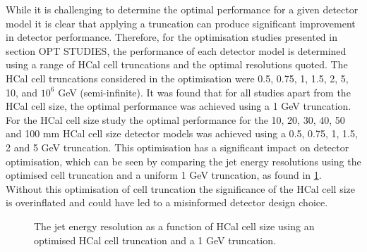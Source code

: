 While it is challenging to determine the optimal performance for a given detector model it is clear that applying a truncation can produce significant improvement in detector performance.  Therefore, for the optimisation studies presented in section OPT STUDIES, the performance of each detector model is determined using a range of HCal cell truncations and the optimal resolutions quoted.  The HCal cell truncations considered in the optimisation were 0.5, 0.75, 1, 1.5, 2, 5, 10, and $10^{6}$ GeV (semi-infinite).  It was found that for all studies apart from the HCal cell size, the optimal performance was achieved using a 1 GeV truncation.  For the HCal cell size study the optimal performance for the 10, 20, 30, 40, 50 and 100 mm HCal cell size detector models was achieved using a 0.5, 0.75, 1, 1.5, 2 and 5 GeV truncation.  This optimisation has a significant impact on detector optimisation, which can be seen by comparing the jet energy resolutions using the optimised cell truncation and a uniform 1 GeV truncation, as found in \ref{fig:jerhcalcellopt}.  Without this optimisation of cell truncation the significance of the HCal cell size is overinflated and could have led to a misinformed detector design choice.  

\begin{figure}
\caption[The jet energy resolution as a function of HCal cell size using \protect{} an optimised HCal cell truncation and \protect{} a fixed 1 GeV truncation.]{The jet energy resolution as a function of HCal cell size using \protect{} an optimised HCal cell truncation and \protect{} a 1 GeV truncation.}
\label{fig:jerhcalcellopt}
\end{figure}

